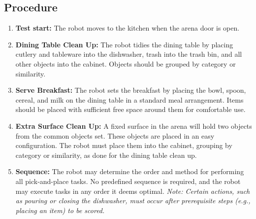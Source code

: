 \subsection*{Procedure}
\begin{enumerate}[nosep]
	\item \textbf{Test start:} The robot moves to the kitchen when the arena door is open.
	\item \textbf{Dining Table Clean Up:} The robot tidies the dining table by placing cutlery and tableware into the dishwasher, trash into the trash bin, and all other objects into the cabinet. Objects should be grouped by category or similarity.
	\item \textbf{Serve Breakfast:} The robot sets the breakfast by placing the bowl, spoon, cereal, and milk on the dining table in a standard meal arrangement. Items should be placed with sufficient free space around them for comfortable use.
	\item \textbf{Extra Surface Clean Up:} A fixed surface in the arena will hold two objects from the common objects set. These objects are placed in an easy configuration. The robot must place them into the cabinet, grouping by category or similarity, as done for the dining table clean up.
	\item \textbf{Sequence:} The robot may determine the order and method for performing all pick-and-place tasks. No predefined sequence is required, and the robot may execute tasks in any order it deems optimal.
	\textit{Note: Certain actions, such as pouring or closing the dishwasher, must occur after prerequisite steps (e.g., placing an item) to be scored.}
\end{enumerate}


